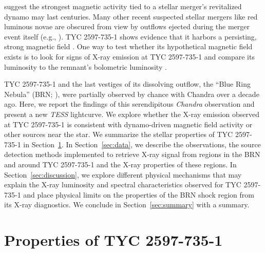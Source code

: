 \documentclass[linenumbers]{aastex631}
\begin{document}
\citet{Soker&Tylenda2007} suggest the strongest magnetic activity tied to a stellar merger's revitalized dynamo may last centuries. Many other recent suspected stellar mergers like red luminous novae are obscured from view by outflows ejected during the merger event itself (e.g., \citealt{Bond+2003, Tylenda+2016}). TYC 2597-735-1 shows evidence that it harbors a persisting, strong magnetic field \citep[e.g., H$\alpha$ emission and variability, radial velocity shifts strongly correlated with the Ca II IRT stellar atmospheric features,][]{2020Natur.587..387H}. One way to test whether its hypothetical magnetic field exists is to look for signs of X-ray emission at TYC 2597-735-1 and compare its luminosity to the remnant's bolometric luminosity \citep{Soker&Tylenda2007}.

TYC 2597-735-1 and the last vestiges of its dissolving outflow, the ``Blue Ring Nebula'' (BRN; \citealt{2020Natur.587..387H}), were partially observed by chance with Chandra over a decade ago. Here, we report the findings of this serendipitous \emph{Chandra} observation and present a new \emph{TESS} lightcurve. We explore whether the X-ray emission observed at TYC 2597-735-1 is consistent with dynamo-driven magnetic field activity or other sources near the star. We summarize the stellar properties of TYC 2597-735-1 in Section~\ref{sec:properties}. In Section~\ref{sec:data}, we describe the observations, the source detection methods implemented to retrieve X-ray signal from regions in the BRN and around TYC 2597-735-1 and the X-ray properties of these regions. In Section~\ref{sec:discussion}, we explore different physical mechanisms that may explain the X-ray luminosity and spectral characteristics observed for TYC 2597-735-1 and place physical limits on the properties of the BRN shock region from its X-ray diagnostics. We conclude in Section~\ref{sec:summary} with a summary.

\section{Properties of TYC 2597-735-1}
\label{sec:properties}
\end{document}
